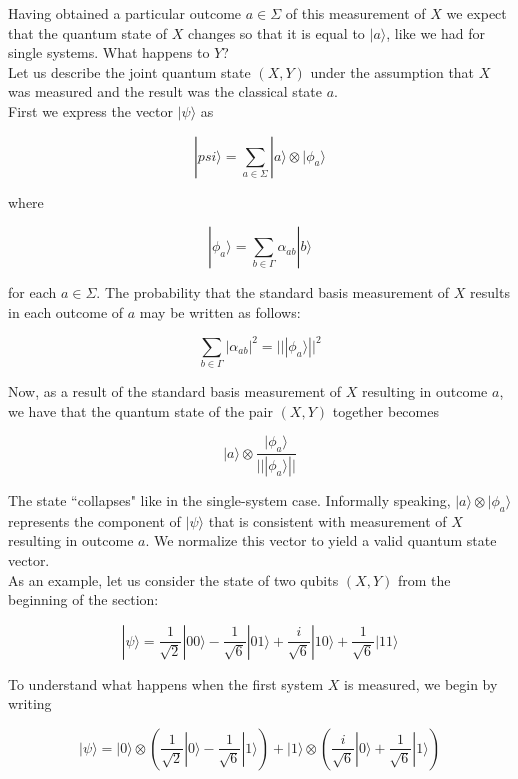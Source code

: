 \documentclass[svgnames]{article}     %
\begin{document}
Having obtained a particular outcome $a \in \Sigma$ of this measurement of $X$ we expect that the quantum state of $X$ changes so that it is equal to $|a\rangle$, like we had for single systems. What happens to $Y$?\\

Let us describe the joint quantum state $(X, Y)$ under the assumption that $X$ was measured and the result was the classical state $a$. \\

First we express the vector $|\psi\rangle $ as 

\[
|psi\rangle = \sum_{a\in\Sigma} |a\rangle \otimes |\phi_a\rangle 
\] \vspace{5px}

where

\[
  |\phi_a\rangle = \sum_{b\in\Gamma} \alpha_{ab}|b\rangle 
\] \vspace{5px}

for each $a\in\Sigma$. The probability that the standard basis measurement of $X$ results in each outcome of $a$ may be written as follows: 

\[
  \sum_{b\in\Gamma} |\alpha_{ab}|^2 = |||\phi_a\rangle ||^2
\] \vspace{5px}

Now, as a result of the standard basis measurement of $X$ resulting in outcome $a$, we have that the quantum state of the pair $(X,Y)$ together becomes 

\[
|a\rangle \otimes \frac{|\phi_a\rangle }{|||\phi_a\rangle ||}
\] \vspace{5px}

The state ``collapses" like in the single-system case. Informally speaking, $|a\rangle \otimes |\phi_a\rangle $ represents the component of $|\psi\rangle $ that is consistent with measurement of $X$ resulting in outcome $a$. We normalize this vector to yield a valid quantum state vector. \\

As an example, let us consider the state of two qubits $(X, Y)$ from the beginning of the section: 

\[
  |\psi\rangle = \frac{1}{\sqrt{2}}|00\rangle - \frac{1}{\sqrt{6}}|01\rangle + \frac{i}{\sqrt{6}}|10\rangle + \frac{1}{\sqrt{6}}|11\rangle 
\] \vspace{5px}

To understand what happens when the first system $X$ is measured, we begin by writing 

\[
  |\psi\rangle = |0\rangle \otimes \left(\frac{1}{\sqrt{2}}|0\rangle  - \frac{1}{\sqrt{6}}|1\rangle \right) + |1\rangle \otimes \left(\frac{i}{\sqrt{6}}|0\rangle + \frac{1}{\sqrt{6}}|1\rangle \right)
\] \vspace{5px}
\end{document}
